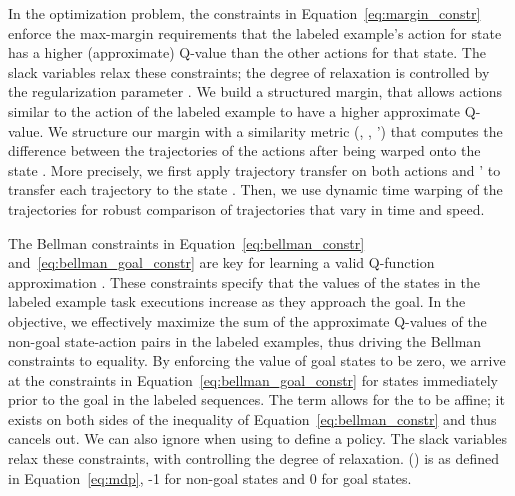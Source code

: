 In the optimization problem, the constraints in Equation~\ref{eq:margin_constr}
enforce the max-margin requirements that the
labeled example's action  for state 
has a higher (approximate) Q-value than the other actions for that
state. The slack variables  relax these constraints;
the degree of relaxation is controlled by the regularization parameter \marginslackc{}.
We build a structured margin, that allows actions similar to the
action of the labeled example to have a higher approximate Q-value.
We structure our margin with a similarity metric
\marginvar{}(, , \actionvar{}') that computes
the difference between the trajectories of the actions after being warped onto
the state . More precisely, we first apply trajectory
transfer on both actions  and \actionvar{}' to transfer
each trajectory to the state . Then, we use dynamic
time warping of the trajectories for robust comparison of trajectories that
vary in time and speed. 

The Bellman constraints in Equation~\ref{eq:bellman_constr} and~\ref{eq:bellman_goal_constr}
are key for learning a valid Q-function approximation \approxq. These constraints specify that
the values of the states in the labeled example task executions increase as they
approach the goal. In the objective, we effectively maximize the sum of the
approximate Q-values of the non-goal state-action pairs in the labeled examples,
thus driving the Bellman constraints to equality. By enforcing the value of goal states
to be zero, we arrive at the constraints in Equation~\ref{eq:bellman_goal_constr} for
states immediately prior to the goal in the labeled sequences.
The \weightszero{} term allows for the \approxq{} to be affine; it exists on
both sides of the inequality of Equation~\ref{eq:bellman_constr} and thus cancels out.
We can also ignore \weightszero{} when using \approxq{} to define a policy. The slack variables
 relax these constraints, with \bellmanslackc{} controlling
the degree of relaxation.
\rewardfn{}(\statevar{}) is as defined in Equation~\ref{eq:mdp},
-1 for non-goal states and 0 for goal states.
